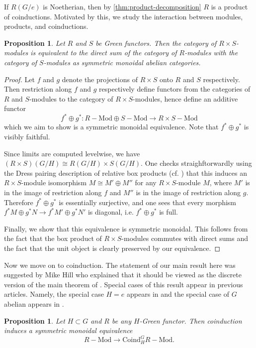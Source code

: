 \documentclass[11pt,dvipsnames]{amsart}
\newtheorem{proposition}[theorem]{Proposition}
\theoremstyle{BoldRemark}
\newcommand{\Mod}{\mathrm{Mod}}
\begin{document}
If $R(G/e)$ is Noetherian, then by \cref{thm:product-decomposition} $R$ is a product of coinductions. Motivated by this, we study the interaction between modules, products, and coinductions.

\begin{proposition}\label{prop:product-induces-module-cat-iso}
	Let $R$ and $S$ be Green functors. Then the category of $R \times S$-modules is equivalent to the direct sum of the category of $R$-modules with the category of $S$-modules as symmetric monoidal abelian categories.
\end{proposition}

\begin{proof}
	Let $f$ and $g$ denote the projections of $R \times S$ onto $R$ and $S$ respectively. Then restriction along $f$ and $g$ respectively define functors from the categories of $R$ and $S$-modules to the category of $R \times S$-modules, hence define an additive functor \[ f^* \oplus g^* : R {-} \Mod \oplus S {-} \Mod \rightarrow R \times S {-} \Mod \] which we aim to show is a symmetric monoidal equivalence. Note that $f^* \oplus g^*$ is visibly faithful.
	
	Since limits are computed levelwise, we have $(R \times S)(G/H) \cong R(G/H) \times S(G/H)$. One checks straighftorwardly using the Dress pairing description of relative box products (cf. \cite{CW25}) that this induces an $R \times S$-module isomorphism $M \cong M' \oplus M''$ for any $R \times S$-module $M$, where $M'$ is in the image of restriction along $f$ and $M''$ is in the image of restriction along $g$. Therefore $f^* \oplus g^*$ is essentially surjective, and one sees that every morphism $f^* M \oplus g^* N \rightarrow f^* M' \oplus g^* N'$ is diagonal, i.e. $f^* \oplus g^*$ is full.
	
	Finally, we show that this equivalence is symmetric monoidal. This follows from the fact that the box product of $R \times S$-modules commutes with direct sums and the fact that the unit object is clearly preserved by our equivalence.
\end{proof}

Now we move on to coinduction. The statement of our main result here was suggested by Mike Hill who explained that it should be viewed as the discrete version of the main theorem of \cite{BDS15}. Special cases of this result appear in previous articles. Namely, the special case $H = e$ appears in \cite{SSW24} and the special case of $G$ abelian appears in \cite{CW25}.

\begin{proposition}\label{prop:coind-induces-module-cat-iso}
	Let $H \subset G$ and $R$ be any $H$-Green functor. Then coinduction induces a symmetric monoidal equivalence \[ R {-} \Mod \rightarrow \mathrm{Coind}_H^G R {-} \Mod . \]
\end{proposition}
\end{document}
